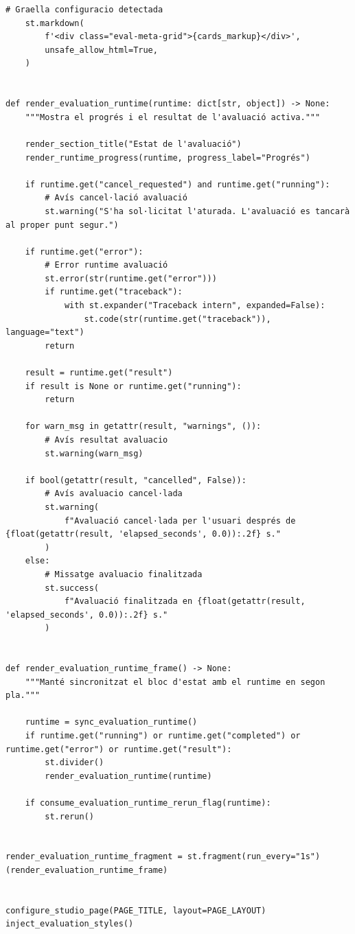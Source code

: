 \documentclass[10pt,a4paper]{article}
\begin{document}
\begin{lstlisting}[style=studioPython,caption={pages/Avaluar\_Agent.py},label={lst:pages-avaluar-agent-py}]
    # Graella configuracio detectada
    st.markdown(
        f'<div class="eval-meta-grid">{cards_markup}</div>',
        unsafe_allow_html=True,
    )


def render_evaluation_runtime(runtime: dict[str, object]) -> None:
    """Mostra el progrés i el resultat de l'avaluació activa."""

    render_section_title("Estat de l'avaluació")
    render_runtime_progress(runtime, progress_label="Progrés")

    if runtime.get("cancel_requested") and runtime.get("running"):
        # Avís cancel·lació avaluació
        st.warning("S'ha sol·licitat l'aturada. L'avaluació es tancarà al proper punt segur.")

    if runtime.get("error"):
        # Error runtime avaluació
        st.error(str(runtime.get("error")))
        if runtime.get("traceback"):
            with st.expander("Traceback intern", expanded=False):
                st.code(str(runtime.get("traceback")), language="text")
        return

    result = runtime.get("result")
    if result is None or runtime.get("running"):
        return

    for warn_msg in getattr(result, "warnings", ()):
        # Avís resultat avaluacio
        st.warning(warn_msg)

    if bool(getattr(result, "cancelled", False)):
        # Avís avaluacio cancel·lada
        st.warning(
            f"Avaluació cancel·lada per l'usuari després de {float(getattr(result, 'elapsed_seconds', 0.0)):.2f} s."
        )
    else:
        # Missatge avaluacio finalitzada
        st.success(
            f"Avaluació finalitzada en {float(getattr(result, 'elapsed_seconds', 0.0)):.2f} s."
        )


def render_evaluation_runtime_frame() -> None:
    """Manté sincronitzat el bloc d'estat amb el runtime en segon pla."""

    runtime = sync_evaluation_runtime()
    if runtime.get("running") or runtime.get("completed") or runtime.get("error") or runtime.get("result"):
        st.divider()
        render_evaluation_runtime(runtime)

    if consume_evaluation_runtime_rerun_flag(runtime):
        st.rerun()


render_evaluation_runtime_fragment = st.fragment(run_every="1s")(render_evaluation_runtime_frame)


configure_studio_page(PAGE_TITLE, layout=PAGE_LAYOUT)
inject_evaluation_styles()


\end{lstlisting}
\end{document}
